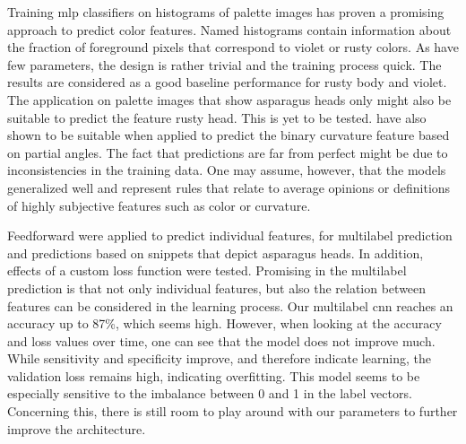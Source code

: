 \bigskip
Training \acrshort{mlp} classifiers on histograms of palette images has proven a promising approach to predict color features. Named histograms contain information about the fraction of foreground pixels that correspond to violet or rusty colors. As  have few parameters, the design is rather trivial and the training process quick. The results are considered as a good baseline performance for rusty body and violet. The application on palette images that show asparagus heads only might also be suitable to predict the feature rusty head. This is yet to be tested.  have also shown to be suitable when applied to predict the binary curvature feature based on partial angles. The fact that predictions are far from perfect might be due to inconsistencies in the training data. One may assume, however, that the models generalized well and represent rules that relate to average opinions or definitions of highly subjective features such as color or curvature.

\bigskip
Feedforward   were applied to predict individual features, for multilabel prediction and predictions based on snippets that depict asparagus heads. In addition, effects of a custom loss function were tested. Promising in the multilabel prediction is that not only individual features, but also the relation between features can be considered in the learning process. Our multilabel  \acrshort{cnn} reaches an accuracy up to 87\%, which seems high. However, when looking at the accuracy and loss values over time, one can see that the model does not improve much. While sensitivity and specificity improve, and therefore indicate learning, the validation loss remains high, indicating overfitting. This model seems to be especially sensitive to the imbalance between 0 and 1 in the label vectors. Concerning this, there is still room to play around with our parameters to further improve the architecture.

